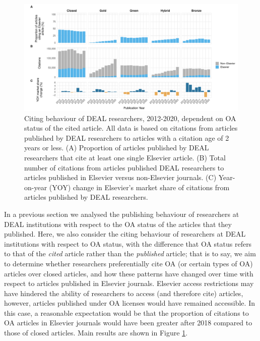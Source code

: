 \documentclass[
]{article}
\begin{document}
\begin{figure}
\centering
\includegraphics{analysis_files/figure-latex/references-publisher-year-oa-1.pdf}
\caption{\label{fig:references-publisher-year-oa}Citing behaviour of DEAL researchers, 2012-2020, dependent on OA status of the cited article. All data is based on citations from articles published by DEAL researchers to articles with a citation age of 2 years or less. (A) Proportion of articles published by DEAL researchers that cite at least one single Elsevier article. (B) Total number of citations from articles published DEAL researchers to articles published in Elsevier versus non-Elsevier journals. (C) Year-on-year (YOY) change in Elsevier's market share of citations from articles published by DEAL researchers.}
\end{figure}

In a previous section we analysed the publishing behaviour of researchers at DEAL institutions with respect to the OA status of the articles that they published. Here, we also consider the citing behaviour of researchers at DEAL institutions with respect to OA status, with the difference that OA status refers to that of the \emph{cited} article rather than the \emph{published} article; that is to say, we aim to determine whether researchers preferentially cite OA (or certain types of OA) articles over closed articles, and how these patterns have changed over time with respect to articles published in Elsevier journals. Elsevier access restrictions may have hindered the ability of researchers to access (and therefore cite) articles, however, articles published under OA licenses would have remained accessible. In this case, a reasonable expectation would be that the proportion of citations to OA articles in Elsevier journals would have been greater after 2018 compared to those of closed articles. Main results are shown in Figure \ref{fig:references-publisher-year-oa}.
\end{document}
